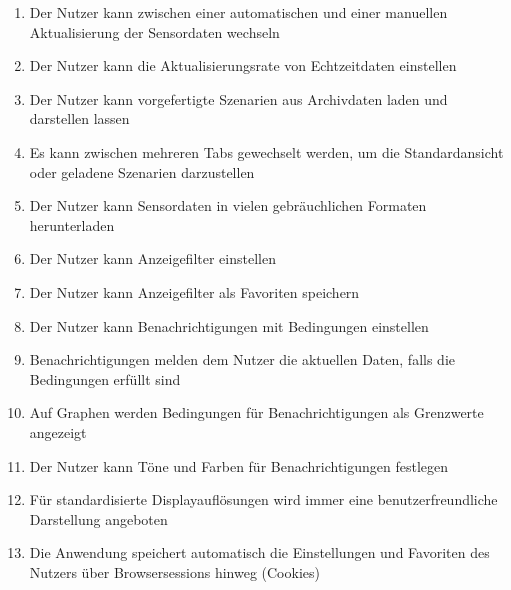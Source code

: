 \begin{enumerate}[label=\textbf{WK\arabic{enumi}0}]
	\item Der Nutzer kann zwischen einer automatischen und einer manuellen Aktualisierung der Sensordaten wechseln
	\item Der Nutzer kann die Aktualisierungsrate von Echtzeitdaten einstellen
	\item Der Nutzer kann vorgefertigte Szenarien aus Archivdaten laden und darstellen lassen
	\item Es kann zwischen mehreren Tabs gewechselt werden, um die Standardansicht oder geladene Szenarien darzustellen
	\item Der Nutzer kann Sensordaten in vielen gebräuchlichen Formaten herunterladen
	\item Der Nutzer kann Anzeigefilter einstellen
	\item Der Nutzer kann Anzeigefilter als Favoriten speichern
	\item Der Nutzer kann Benachrichtigungen mit Bedingungen einstellen
	\item Benachrichtigungen melden dem Nutzer die aktuellen Daten, falls die Bedingungen erfüllt sind
	\item Auf Graphen werden Bedingungen für Benachrichtigungen als Grenzwerte angezeigt
	\item Der Nutzer kann Töne und Farben für Benachrichtigungen festlegen
	\item Für standardisierte Displayauflösungen wird immer eine benutzerfreundliche Darstellung angeboten
	\item Die Anwendung speichert automatisch die Einstellungen und Favoriten des Nutzers über Browsersessions hinweg (Cookies)
	
\end{enumerate}

